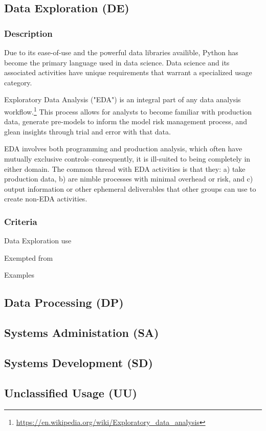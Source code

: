 	\subsection{Data Exploration (DE)}

		\subsubsection{Description}

			Due to its ease-of-use and the powerful data libraries availible, Python has become the primary language used in data science. Data science and its associated activities have unique requirements that warrant a specialized usage category. 

			Exploratory Data Analysis ("EDA") is an integral part of any data analysis workflow.\footnote{\url{https://en.wikipedia.org/wiki/Exploratory_data_analysis}} This process allows for analysts to become familiar with production data, generate pre-models to inform the model risk management process, and glean insights through trial and error with that data. 

			EDA involves both programming and production analysis, which often have mutually exclusive controls--consequently, it is ill-suited to being completely in either domain. The common thread with EDA activities is that they: a) take production data, b) are nimble processes with minimal overhead or risk, and c) output information or other ephemeral deliverables that other groups can use to create non-EDA activities.

		\subsubsection{Criteria}

			Data Exploration use

			Exempted from 

			Examples


	\subsection{Data Processing (DP)}

	\subsection{Systems Administation (SA)}

	\subsection{Systems Development (SD)}

	\subsection{Unclassified Usage (UU)}